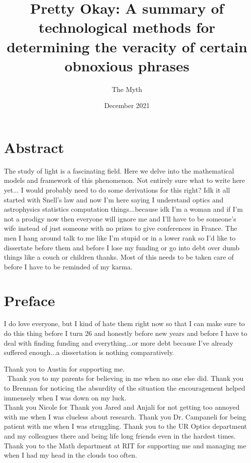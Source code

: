 \documentclass{dcthesis}
\title{Pretty Okay: A summary of technological methods for determining the veracity of certain obnoxious phrases}
\author{The Myth}
\date{December 2021}
\theoremstyle{definition}
\theoremstyle{remark}
\begin{document}
\frontmatter

\maketitle
\restoregeometry

\chapter*{Abstract}
The study of light is a fascinating field. Here we delve into the mathematical models and framework of this phenomenon. Not entirely sure what to write here yet... I would probably need to do some derivations for this right? Idk it all started with Snell's law and now I'm here saying I understand optics and astrophysics statistics computation things...because idk I'm a woman and if I'm not a prodigy now then everyone will ignore me and I'll have to be someone's wife instead of just someone with no prizes to give conferences in France. The men I hang around talk to me like I'm stupid or in a lower rank so I'd like to dissertate before them and before I lose my funding or go into debt over dumb things like a couch or children thanks. Most of this needs to be taken care of before I have to be reminded of my karma. 

\chapter*{Preface}
I do love everyone, but I kind of hate them right now so that I can make sure to do this thing before I turn 26 and honestly before new years and before I have to deal with finding funding and everything...or more debt because I've already suffered enough...a dissertation is nothing comparatively.  

Thank you to Austin for supporting me. \\\
Thank you to my parents for believing in me when no one else did. Thank you to Brennan for noticing the absurdity of the situation the encouragement helped immensely when I was down on my luck. \\ Thank you Nicole for 
Thank you Jared and Anjali for not getting too annoyed with me when I was clueless about research. 
Thank you Dr. Campaneli for being patient with me when I was struggling. 
Thank you to the UR Optics department and my colleagues there and being life long friends even in the hardest times. \\ 
Thank you to the Math department at RIT for supporting me and managing me when I had my head in the clouds too often. 
\end{document}
